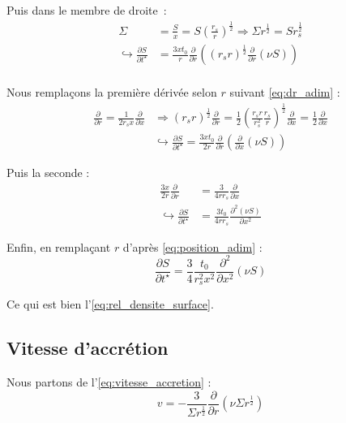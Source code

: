 Puis dans le membre de droite :
\begin{align}
    \Sigma &= \frac{S}{x} = S \left( \frac{r_s}{r} \right)^\frac{1}{2} \Rightarrow \Sigma r^\frac{1}{2} = S r_s^\frac{1}{2} \\
    \hookrightarrow \frac{\partial S}{\partial t^\star} &= \frac{3 x t_0}{r} \frac{\partial}{\partial r} \left( (r_s r)^\frac{1}{2} \frac{\partial}{\partial r} \left( \nu S \right) \right) \\
\end{align}

Nous remplaçons la première dérivée selon $r$ suivant \eqref{eq:dr_adim} :
\begin{align}
    \frac{\partial}{\partial r} = \frac{1}{2 r_s x} \frac{\partial}{\partial x}
    &\Rightarrow (r_s r)^\frac{1}{2} \frac{\partial}{\partial r} = \frac{1}{2} \left( \frac{r_s r}{r_s^2} \frac{r_s}{r} \right)^\frac{1}{2} \frac{\partial}{\partial x}
                                                                = \frac{1}{2} \frac{\partial}{\partial x} \\
    &\hookrightarrow \frac{\partial S}{\partial t^\star} = \frac{3 x t_0}{2 r} \frac{\partial}{\partial r} \left( \frac{\partial}{\partial x} \left( \nu S \right) \right)
\end{align}

Puis la seconde :
\begin{align}
    \frac{3 x}{2 r} \frac{\partial}{\partial r} &= \frac{3}{4 r r_s} \frac{\partial}{\partial x} \\
    \hookrightarrow \frac{\partial S}{\partial t^\star} &= \frac{3 t_0}{4 r r_s} \frac{\partial^2 (\nu S)}{\partial x^2}
\end{align}

Enfin, en remplaçant $r$ d’après \eqref{eq:position_adim} :
\begin{equation}
    \frac{\partial S}{\partial t^\star} = \frac{3}{4} \frac{t_0}{r_s^2 x^2} \frac{\partial^2}{\partial x^2} \left(\nu S\right)
\end{equation}

Ce qui est bien l’\cref{eq:rel_densite_surface}.

\subsection{Vitesse d’accrétion}
\label{app:vitesse_accretion}

Nous partons de l’\cref{eq:vitesse_accretion} :
\begin{equation}
    v = - \frac{3}{\Sigma r^\frac{1}{2}} \frac{\partial}{\partial r} \left(\nu \Sigma r^\frac{1}{2} \right)
\end{equation}

